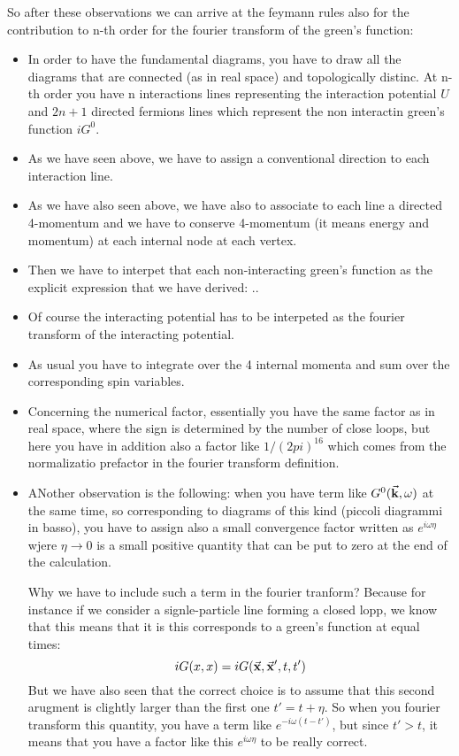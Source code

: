 \documentclass[../main/main.tex]{subfiles}
\begin{document}
So after these observations we can arrive at the feymann rules also for the contribution to n-th order for the fourier transform of the green's function:
\begin{itemize}
\item In order to have the fundamental diagrams, you have to draw all the diagrams that are connected (as in real space) and topologically distinc. At n-th order you have n interactions lines representing the interaction potential \( U \) and \( 2n+1 \) directed fermions lines which represent the non interactin green's function \( iG^0 \).
\item As we have seen above, we have to assign a conventional direction to each interaction line.
\item As we have also seen above, we have also to associate to each line a directed 4-momentum and we have to conserve 4-momentum (it means energy and momentum) at each internal node at each vertex.

\item Then we have to interpet that each non-interacting green's function as the explicit expression that we have derived:
..
\item Of course the interacting potential has to be interpeted as the fourier transform of the interacting potential.

\item As usual you have to integrate over the 4 internal momenta and sum over the corresponding spin variables.

\item Concerning the numerical factor, essentially you have the same factor as in real space, where the sign is determined by the number of close loops, but here you have in addition also a factor like \( 1/(2pi)^{16} \) which comes from the normalizatio prefactor in the fourier transform definition.

\item ANother observation is the following: when you have term like \( G^0 (\va{k}, \omega ) \) at the same time, so corresponding to diagrams of this kind (piccoli diagrammi in basso), you have to assign also a small convergence factor written as \( e^{i \omega \eta }  \) wjere \( \eta \rightarrow 0 \) is a small positive quantity that can be put to zero at the end of the calculation.

Why we have to include such a term in the fourier tranform?
Because for instance if we consider a signle-particle line forming a closed lopp, we know that this means that it is this corresponds to a green's function at equal times:
\begin{equation*}
  i G(x,x) = i G(\va{x},\va{x}',t,t')
\end{equation*}
But we have also seen that the correct choice is to assume that this second arugment is clightly larger than the first one \( t'=t + \eta  \). So when you fourier transform this quantity, you have a term like \( e^{-i \omega (t-t')}  \), but since \( t'>t \), it means that you have a factor like this \( e^{i \omega \eta }  \) to be really correct.


\end{itemize}
\end{document}
